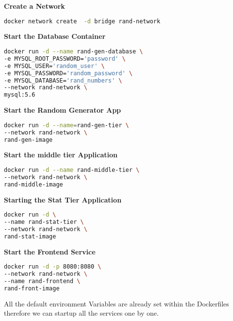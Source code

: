 \textbf{Create a Network}
\begin{lstlisting}[language=Bash]
docker network create  -d bridge rand-network
\end{lstlisting}

\textbf{Start the Database Container}

\begin{lstlisting}[language=Bash]
docker run -d --name rand-gen-database \
-e MYSQL_ROOT_PASSWORD='password' \
-e MYSQL_USER='random_user' \
-e MYSQL_PASSWORD='random_password' \
-e MYSQL_DATABASE='rand_numbers' \
--network rand-network \
mysql:5.6
\end{lstlisting}

\textbf{Start the Random Generator App}
\begin{lstlisting}[language=Bash]
docker run -d --name=rand-gen-tier \
--network rand-network \
rand-gen-image
\end{lstlisting}

\textbf{Start the middle tier Application}
\begin{lstlisting}[language=Bash]
docker run -d --name rand-middle-tier \
--network rand-network \
rand-middle-image
\end{lstlisting}

\textbf{Starting the Stat Tier Application}
\begin{lstlisting}[language=Bash]
docker run -d \
--name rand-stat-tier \
--network rand-network \ 
rand-stat-image
\end{lstlisting}

\textbf{Start the Frontend Service}
\begin{lstlisting}[language=Bash]
docker run -d -p 8080:8080 \
--network rand-network \
--name rand-frontend \
rand-front-image
\end{lstlisting}

All the default environment Variables are already set within the Dockerfiles therefore we can startup all the services one by one.
